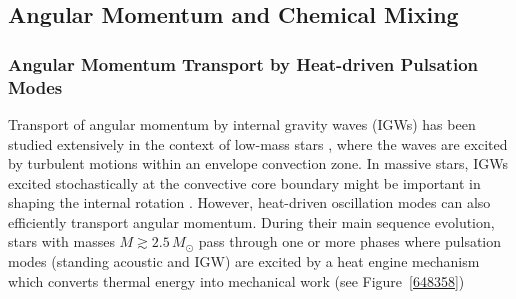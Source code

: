 
\subsection{Angular Momentum and Chemical Mixing}

\subsubsection{Angular Momentum Transport by Heat-driven Pulsation Modes}

Transport of angular momentum by internal gravity waves (IGWs) has been studied extensively in the context of low-mass stars \citep[e.g.,][]{Schatzman:1993,Kumar:1997,Zahn:1997,Talon:2002,Talon:2005,Rogers:2008aa}, where the waves are excited by turbulent motions within an envelope convection zone. In massive stars, IGWs excited stochastically at the convective core boundary might be important in shaping the internal rotation \citep[e.g.][]{Rogers:2013,Lee:2014,Rogers:2015}. However, heat-driven oscillation modes can also efficiently transport angular momentum. During their main sequence evolution, stars with masses $M \gtrsim 2.5\,M_{\odot}$ pass through one or more phases where pulsation modes (standing acoustic and IGW) are excited by a heat engine mechanism which converts thermal energy into mechanical work (see Figure~\ref{648358})

